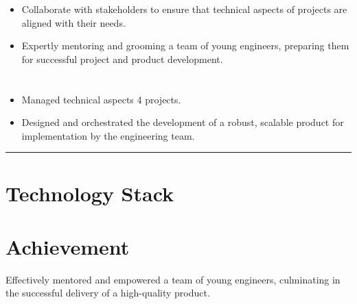 \documentclass[12pt]{res}
\begin{document}
\begin{resume}
\begin{multicols}{2}
\begin{itemize}
\item Collaborate with stakeholders to ensure that technical aspects of projects are aligned with their needs.

\item Expertly mentoring and grooming a team of young engineers, preparing them for successful project and product development.
		\end{itemize}
	\section{}
		\begin{itemize}
			\setlength{\itemindent}{0pt}
			\item Managed technical aspects 4 projects.

\item Designed and orchestrated the development of a robust, scalable product for implementation by the engineering team.
		\end{itemize}
\end{multicols}

\vspace{-20pt}
\begin{minipage}[t]{0.55\linewidth}
	\rule{0.25\textwidth}{2pt}
	\begin{multicols}{2}
		\section{Technology Stack}
		\columnbreak
		\section{}
	\end{multicols}
	\vspace{1pt}
\end{minipage}
\hfill
\begin{minipage}[t]{0.42\linewidth}
	\vspace{18pt}
	\section{Achievement}
	\begin{flushleft}
        \begin{itemize}
		\footnotesize{\item Effectively mentored and empowered a team of young engineers, culminating in the successful delivery of a high-quality product.}
        \end{itemize}
	\end{flushleft}
\end{minipage}


\end{resume}
\end{document}
